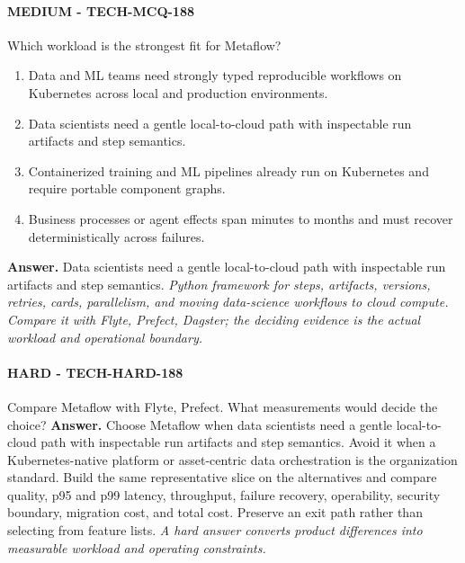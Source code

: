 \paragraph{MEDIUM - TECH-MCQ-188} Which workload is the strongest fit for Metaflow?
\begin{enumerate}[label=\Alph*.]
\item Data and ML teams need strongly typed reproducible workflows on Kubernetes across local and production environments.
\item Data scientists need a gentle local-to-cloud path with inspectable run artifacts and step semantics.
\item Containerized training and ML pipelines already run on Kubernetes and require portable component graphs.
\item Business processes or agent effects span minutes to months and must recover deterministically across failures.
\end{enumerate}
\textbf{Answer.} Data scientists need a gentle local-to-cloud path with inspectable run artifacts and step semantics.
\textit{Python framework for steps, artifacts, versions, retries, cards, parallelism, and moving data-science workflows to cloud compute. Compare it with Flyte, Prefect, Dagster; the deciding evidence is the actual workload and operational boundary.}
\paragraph{HARD - TECH-HARD-188} Compare Metaflow with Flyte, Prefect. What measurements would decide the choice?
\textbf{Answer.} Choose Metaflow when data scientists need a gentle local-to-cloud path with inspectable run artifacts and step semantics. Avoid it when a Kubernetes-native platform or asset-centric data orchestration is the organization standard. Build the same representative slice on the alternatives and compare quality, p95 and p99 latency, throughput, failure recovery, operability, security boundary, migration cost, and total cost. Preserve an exit path rather than selecting from feature lists.
\textit{A hard answer converts product differences into measurable workload and operating constraints.}
